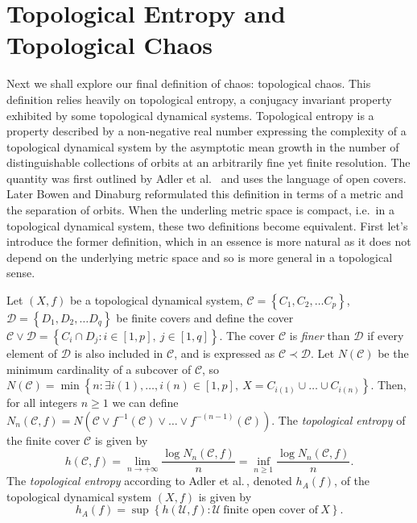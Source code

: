 \section{Topological Entropy and Topological Chaos} \label{sec:topological-chaos}
Next we shall explore our final definition of chaos: topological chaos. This definition relies heavily on topological entropy, a conjugacy invariant property exhibited by some topological dynamical systems. Topological entropy is a property described by a non-negative real number expressing the complexity of a topological dynamical system by the asymptotic mean growth in the number of distinguishable collections of orbits at an arbitrarily fine yet finite resolution. The quantity was first outlined by Adler et al.\ \cite{adler} and uses the language of open covers. Later Bowen \cite{bowen} and Dinaburg \cite{dinaburg} reformulated this definition in terms of a metric and the separation of orbits. When the underling metric space is compact, i.e.\ in a topological dynamical system, these two definitions become equivalent. First let's introduce the former definition, which in an essence is more natural as it does not depend on the underlying metric space and so is more general in a topological sense.

\begin{defn}
    Let $(X, f)$ be a topological dynamical system, $\mathcal{C} = \left\lbrace C_1, C_2, \dots C_p \right\rbrace$, $\mathcal{D} = \left\lbrace D_1, D_2, \dots D_q \right\rbrace$ be finite covers and define the cover $\mathcal{C} \vee \mathcal{D} = \left\lbrace C_i \cap D_j : i \in [1, p], \ j \in [1, q] \right\rbrace$. The cover $\mathcal{C}$ is \emph{finer} than $\mathcal{D}$ if every element of $\mathcal{D}$ is also included in $\mathcal{C}$, and is expressed as $\mathcal{C} \prec \mathcal{D}$. Let $N(\mathcal{C})$ be the minimum cardinality of a subcover of $\mathcal{C}$, so $N(\mathcal{C}) = \min \left\lbrace n : \exists i(1), \dots, i(n) \in [1, p],\ X = C_{i(1)} \cup \dots \cup C_{i(n)}\right\rbrace$. Then, for all integers $n \geq 1$ we can define $N_n(\mathcal{C}, f) = N\left(\mathcal{C} \vee f^{-1}(\mathcal{C}) \vee \dots \vee f^{-(n-1)}(\mathcal{C})\right)$. The \emph{topological entropy} of the finite cover $\mathcal{C}$ is given by \[h(\mathcal{C}, f) = \lim_{n \to +\infty}\frac{\log{N_n(\mathcal{C}, f)}}{n} = \inf_{n \geq 1} \frac{\log{N_n(\mathcal{C}, f)}}{n}.\] The \emph{topological entropy} according to Adler et al.\,, denoted $h_A(f)$, of the topological dynamical system $(X, f)$ is given by \[h_{A}(f) = \sup\left\lbrace h(\mathcal{U}, f): \mathcal{U} \ \text{finite open cover of} \ X \right\rbrace.\]
\end{defn}

